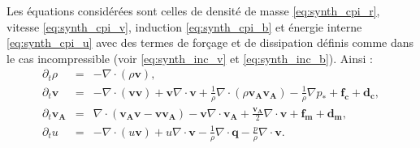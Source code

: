 Les équations considérées sont celles de densité de masse \eqref{eq:synth_cpi_r}, vitesse  \eqref{eq:synth_cpi_v}, induction \eqref{eq:synth_cpi_b} et énergie interne  \eqref{eq:synth_cpi_u} avec des termes de forçage et de dissipation définis comme dans le cas incompressible (voir \eqref{eq:synth_inc_v} et \eqref{eq:synth_inc_b}). Ainsi :
\begin{eqnarray}
\label{eq:turb_cpi_r} \partial_t \rho &=& - \nabla \cdot \left(\rho \boldsymbol{v}\right), \\
\label{eq:turb_cpi_v}\partial_t  \boldsymbol{v} &=&- \nabla \cdot \left(\boldsymbol{v}\boldsymbol{v}\right) + \boldsymbol{v} \nabla \cdot \boldsymbol{v}  + \frac{1}{\rho} \nabla \cdot \left(\rho \boldsymbol{v_A}\boldsymbol{v_A}\right) - \frac{1}{\rho}  \nabla p_*  + \boldsymbol{f_c} + \boldsymbol{d_c} ,\\
\label{eq:turb_cpi_b}\partial_t \boldsymbol{v_A} &=&   \nabla \cdot \left(\boldsymbol{v_A}\boldsymbol{v} - \boldsymbol{v}\boldsymbol{v_A}\right) -  \boldsymbol{v}  \nabla \cdot \boldsymbol{v_A} +  \frac{\boldsymbol{v_A}}{2}  \nabla \cdot \boldsymbol{v} + \boldsymbol{f_m} + \boldsymbol{d_m} ,\\
\label{eq:turb_cpi_u}\partial_t u &=& - \nabla \cdot \left(u \boldsymbol{v}\right) + u  \nabla \cdot \boldsymbol{v} -\frac{1}{\rho} \nabla \cdot \boldsymbol{q}  - \frac{p}{\rho}  \nabla \cdot \boldsymbol{v} .
\end{eqnarray}


